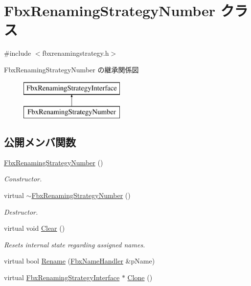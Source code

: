 \hypertarget{class_fbx_renaming_strategy_number}{}\section{Fbx\+Renaming\+Strategy\+Number クラス}
\label{class_fbx_renaming_strategy_number}


{\ttfamily \#include $<$fbxrenamingstrategy.\+h$>$}

Fbx\+Renaming\+Strategy\+Number の継承関係図\begin{figure}[H]
\begin{center}
\leavevmode
\includegraphics[height=2.000000cm]{class_fbx_renaming_strategy_number}
\end{center}
\end{figure}
\subsection*{公開メンバ関数}
\begin{DoxyCompactItemize}
\item 
\hyperlink{class_fbx_renaming_strategy_number_a804b86f501a15158ce4c8b6b065e682d}{Fbx\+Renaming\+Strategy\+Number} ()
\begin{DoxyCompactList}\small\item\em Constructor. \end{DoxyCompactList}\item 
virtual \hyperlink{class_fbx_renaming_strategy_number_a1ad543ecf2a3fe15324dd01f69c35ac1}{$\sim$\+Fbx\+Renaming\+Strategy\+Number} ()
\begin{DoxyCompactList}\small\item\em Destructor. \end{DoxyCompactList}\item 
virtual void \hyperlink{class_fbx_renaming_strategy_number_aaf762d4d2ab243e6868b5d77a3ed8040}{Clear} ()
\begin{DoxyCompactList}\small\item\em Resets internal state regarding assigned names. \end{DoxyCompactList}\item 
virtual bool \hyperlink{class_fbx_renaming_strategy_number_ae619f9e95e3fcb215a12728dfb739659}{Rename} (\hyperlink{class_fbx_name_handler}{Fbx\+Name\+Handler} \&p\+Name)
\item 
virtual \hyperlink{class_fbx_renaming_strategy_interface}{Fbx\+Renaming\+Strategy\+Interface} $\ast$ \hyperlink{class_fbx_renaming_strategy_number_a05a9960c25cbbabb79ab020930fed395}{Clone} ()
\end{DoxyCompactItemize}


